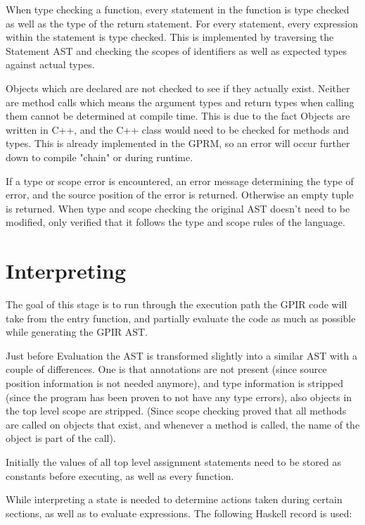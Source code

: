 When type checking a function, every statement in the function is type checked
as well as the type of the return statement. For every statement,
every expression within the statement is type checked. This is implemented by traversing
the Statement AST and checking the scopes of identifiers as well as expected types
against actual types.

Objects which are declared are not checked to see if they actually exist. Neither
are method calls which means the argument types and return types when calling them
cannot be determined at compile time. This is due to the fact Objects are written
in C++, and the C++ class would need to be checked for methods and types. This is already
implemented in the GPRM, so an error will occur further down to compile "chain" or during
runtime.

If a type or scope error is encountered, an error message determining the type of error,
and the source position of the error is returned. Otherwise an empty tuple is returned.
When type and scope checking the original AST doesn't need to be modified, only verified
that it follows the type and scope rules of the language.


\section{Interpreting}

The goal of this stage is to run through the execution path the GPIR code
will take from the entry function, and partially evaluate the code as much
as possible while generating the GPIR AST.

Just before Evaluation the AST is transformed slightly into a similar AST
with a couple of differences. One is that annotations are not present (since source position information
is not needed anymore), and type information is stripped (since the program has been proven to 
not have any type errors), also objects in the top level scope are stripped. (Since scope checking
proved that all methods are called on objects that exist, and whenever a method is called, the
name of the object is part of the call).

Initially the values of all top level assignment statements need to be stored
as constants before executing, as well as every function.

While interpreting a state is needed to determine actions taken
during certain sections, as well as to evaluate expressions.
The following Haskell record is used:


